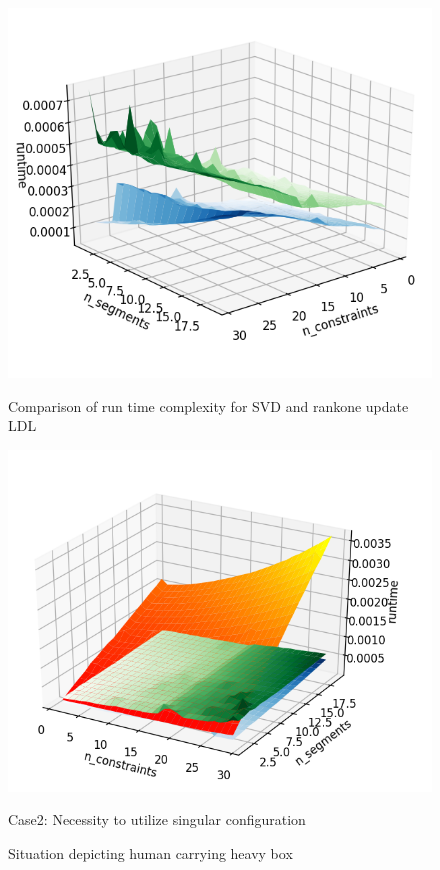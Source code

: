 


\begin{figure}[h!]
	\centering
	\begin{minipage}{0.45\textwidth}
		\centering
		\includegraphics[width=1.0\textwidth]{images/svdvsrankone} %
		\caption{Comparison of run time complexity for SVD and rankone update LDL}
		\label{svdvsrankone}
	\end{minipage}\hfill
	\begin{minipage}{0.45\textwidth}
		\centering
		\includegraphics[width=1.0\textwidth]{images/all3} %
		\caption{Situation depicting human carrying heavy box \cite{mot1}}
		{Case2: Necessity to utilize singular configuration}
	\end{minipage}
\end{figure}

